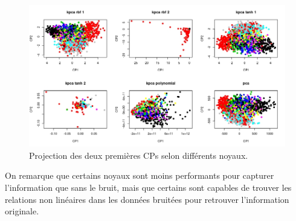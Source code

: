 \begin{figure}[H]
	\includegraphics[width=\textwidth]{comparaison-noisy}
	\caption{Projection des deux premières CPs selon différents noyaux.}
\end{figure}

On remarque que certains noyaux sont moins performants pour capturer l'information que sans le bruit, mais que certains sont capables de trouver les relations non linéaires dans les données bruitées pour retrouver l'information originale. 
